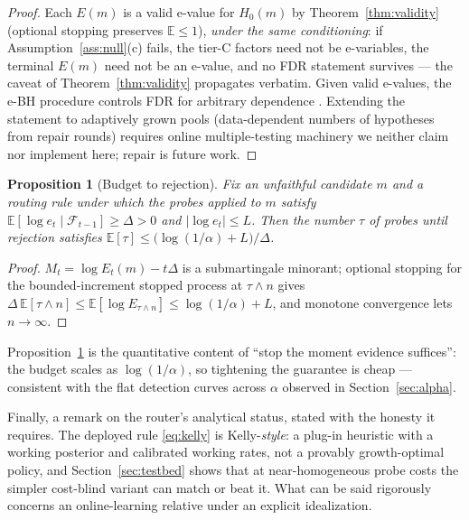 \documentclass[pdflatex,sn-mathphys-num]{sn-jnl}
\theoremstyle{thmstyleone}
\newtheorem{proposition}[theorem]{Proposition}
\theoremstyle{thmstyletwo}
\newcommand{\Eproc}{E}
\newcommand{\Filt}{\mathcal{F}}
\newcommand{\HO}{H_0}
\begin{document}
\begin{proof}
Each $\Eproc(m)$ is a valid e-value for $\HO(m)$ by
Theorem~\ref{thm:validity} (optional stopping preserves
$\mathbb{E} \le 1$), \emph{under the same conditioning}: if
Assumption~\ref{ass:null}(c) fails, the tier-C factors need not be
e-variables, the terminal $\Eproc(m)$ need not be an e-value, and no
FDR statement survives --- the caveat of
Theorem~\ref{thm:validity} propagates verbatim. Given valid
e-values, the e-BH procedure controls FDR for arbitrary dependence
\cite{wang2022false}. Extending the statement to adaptively grown
pools (data-dependent numbers of hypotheses from repair rounds)
requires online multiple-testing machinery we neither claim nor
implement here; repair is future work.
\end{proof}

\begin{proposition}[Budget to rejection]\label{prop:budget}
Fix an unfaithful candidate $m$ and a routing rule under which the
probes applied to $m$ satisfy
$\mathbb{E}[\log e_t \mid \Filt_{t-1}] \ge \Delta > 0$ and
$|\log e_t| \le L$. Then the number $\tau$ of probes until rejection
satisfies
$\mathbb{E}[\tau] \le \bigl(\log(1/\alpha) + L\bigr)/\Delta$.
\end{proposition}

\begin{proof}
$M_t = \log \Eproc_t(m) - t\Delta$ is a submartingale minorant;
optional stopping for the bounded-increment stopped process at
$\tau \wedge n$ gives
$\Delta\,\mathbb{E}[\tau \wedge n] \le
\mathbb{E}[\log \Eproc_{\tau \wedge n}] \le \log(1/\alpha) + L$,
and monotone convergence lets $n \to \infty$.
\end{proof}

Proposition~\ref{prop:budget} is the quantitative content of ``stop
the moment evidence suffices'': the budget scales as
$\log(1/\alpha)$, so tightening the guarantee is cheap --- consistent
with the flat detection curves across $\alpha$ observed in
Section~\ref{sec:alpha}.

Finally, a remark on the router's analytical status, stated with the
honesty it requires. The deployed rule \eqref{eq:kelly} is
Kelly-\emph{style}: a plug-in heuristic with a working posterior and
calibrated working rates, not a provably growth-optimal policy, and
Section~\ref{sec:testbed} shows that at near-homogeneous probe costs
the simpler cost-blind variant can match or beat it. What can be said
rigorously concerns an online-learning relative under an explicit
idealization.
\end{document}
